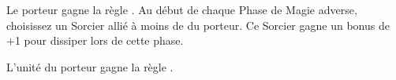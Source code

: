 \endpricelist

\armymagicalbanners

\startpricelist

Le porteur gagne la règle \channel{}. Au début de chaque Phase de Magie adverse, choisissez un Sorcier allié à moins de  du porteur. Ce Sorcier gagne un bonus de +1 pour dissiper lors de cette phase.

L'unité du porteur gagne la règle \thunderouscharge{}. %

\endpricelist

\closearmymagicalitems








\quickrefsheettitle

